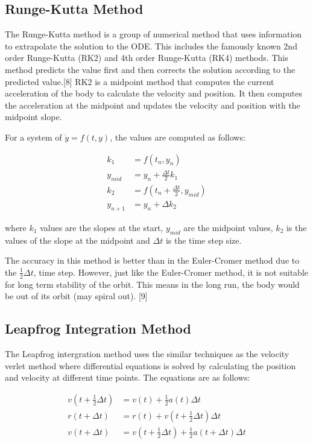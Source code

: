 \documentclass[12 pt, a4paper]{article}
\begin{document}
\subsection{Runge-Kutta Method}
The Runge-Kutta method is a group of numerical method that uses information to extrapolate the solution to the ODE. This includes the famously
known 2nd order Runge-Kutta (RK2) and 4th order Runge-Kutta (RK4) methods. This method predicts the value first and then corrects the 
solution according to the predicted value.[8] RK2 is a midpoint method that computes the current acceleration of the body to calculate the 
velocity and position. It then computes the acceleration at the midpoint and updates the velocity and position with the midpoint slope.

For a system of $\dot{y} = f(t,y)$, the values are computed as follows:

\begin{align}
k_1 &= f(t_n, y_n) \tag{Eq. 9a} \\
y_{mid} &= y_n + \frac{\Delta t}{2}k_1 \tag{9b} \\
k_2 &= f(t_n + \frac{\Delta t}{2}, y_{mid}) \tag{9c} \\
y_{n+1} &= y_n + \Delta k_2 \tag{9d}
\end{align}

where $k_1$ values are the slopes at the start, $y_{mid}$ are the midpoint values, $k_2$ is the values of the slope at the midpoint 
and $\Delta t$ is the time step size.

The accuracy in this method is better than in the Euler-Cromer method due to the $\frac{1}{2}\Delta t$, time step. However, just like 
the Euler-Cromer method, it is not suitable for long term stability of the orbit. This means in the long run, the body would be out of its 
orbit (may spiral out). [9]

\subsection{Leapfrog Integration Method}
The Leapfrog intergration method uses the similar techniques as the velocity verlet method where differential equations is solved by calculating the
position and velocity at different time points. The equations are as follows:

\begin{align}
v(t +\frac{1}{2}\Delta t) &= v(t) + \frac{1}{2}a(t)\Delta t \tag{Eq. 10a} \\
r(t + \Delta t) &= r(t) + v(t +\frac{1}{2}\Delta t)\Delta t \tag{10b} \\
v(t +\Delta t) &= v(t +\frac{1}{2}\Delta t) + \frac{1}{2}a(t + \Delta t)\Delta t \tag{10c}
\end{align}
\end{document}
